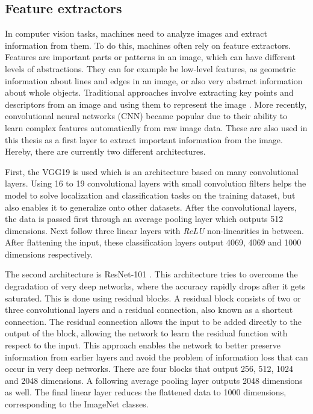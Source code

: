 \subsection{Feature extractors}
\label{sec:feature-extractors}
In computer vision tasks, machines need to analyze images and extract information from them.
To do this, machines often rely on feature extractors.
Features are important parts or patterns in an image, which can have different levels of abstractions.
They can for example be low-level features, as geometric information about lines and edges in an image, or also very abstract information about whole objects.
Traditional approaches involve extracting key points and descriptors from an image and using them to represent the image \citep{Harris1988,Lowe1999,Bay2006}.
More recently, convolutional neural networks (CNN) became popular due to their ability to learn complex features automatically from raw image data.
These are also used in this thesis as a first layer to extract important information from the image. Hereby, there are currently two different architectures.

First, the VGG19 \citep{Simonyan2015} is used which is an architecture based on many convolutional layers.
Using 16 to 19 convolutional layers with small convolution filters helps the model to solve localization and classification tasks on the training dataset, but also enables it to generalize onto other datasets.
After the convolutional layers, the data is passed first through an average pooling layer which outputs 512 dimensions.
Next follow three linear layers with \emph{ReLU} non-linearities in between.
After flattening the input, these classification layers output 4069, 4069 and 1000 dimensions respectively.

The second architecture is ResNet-101 \citep{He2016}.
This architecture tries to overcome the degradation of very deep networks, where the accuracy rapidly drops after it gets saturated.
This is done using residual blocks.
A residual block consists of two or three convolutional layers and a residual connection, also known as a shortcut connection.
The residual connection allows the input to be added directly to the output of the block, allowing the network to learn the residual function with respect to the input.
This approach enables the network to better preserve information from earlier layers and avoid the problem of information loss that can occur in very deep networks.
There are four blocks that output 256, 512, 1024 and 2048 dimensions.
A following average pooling layer outputs 2048 dimensions as well.
The final linear layer reduces the flattened data to 1000 dimensions, corresponding to the ImageNet classes.

